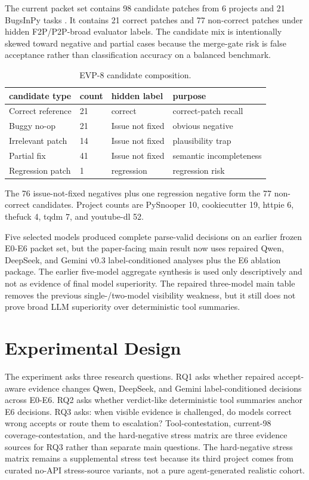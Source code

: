 \documentclass[conference]{IEEEtran}
\begin{document}
The current packet set contains 98 candidate patches from 6 projects and 21 BugsInPy tasks \cite{widyasari_fse_2020_bugsinpy}. It contains 21 correct patches and 77 non-correct patches under hidden F2P/P2P-broad evaluator labels. The candidate mix is intentionally skewed toward negative and partial cases because the merge-gate risk is false acceptance rather than classification accuracy on a balanced benchmark.

\begin{table}[t]
\centering
\scriptsize
\setlength{\tabcolsep}{2pt}
\caption{EVP-8 candidate composition.}
\label{tab:apsec-2}
\begin{tabularx}{\textwidth}{YYYY}
\toprule
candidate type & count & hidden label & purpose \\
\midrule
Correct reference & 21 & correct & correct-patch recall \\
Buggy no-op & 21 & Issue not fixed & obvious negative \\
Irrelevant patch & 14 & Issue not fixed & plausibility trap \\
Partial fix & 41 & Issue not fixed & semantic incompleteness \\
Regression patch & 1 & regression & regression risk \\
\bottomrule
\end{tabularx}
\end{table}

The 76 issue-not-fixed negatives plus one regression negative form the 77 non-correct candidates. Project counts are PySnooper 10, cookiecutter 19, httpie 6, thefuck 4, tqdm 7, and youtube-dl 52.

Five selected models produced complete parse-valid decisions on an earlier frozen E0-E6 packet set, but the paper-facing main result now uses repaired Qwen, DeepSeek, and Gemini v0.3 label-conditioned analyses plus the E6 ablation package. The earlier five-model aggregate synthesis is used only descriptively and not as evidence of final model superiority. The repaired three-model main table removes the previous single-/two-model visibility weakness, but it still does not prove broad LLM superiority over deterministic tool summaries.

\section{Experimental Design}

The experiment asks three research questions. RQ1 asks whether repaired accept-aware evidence changes Qwen, DeepSeek, and Gemini label-conditioned decisions across E0-E6. RQ2 asks whether verdict-like deterministic tool summaries anchor E6 decisions. RQ3 asks: when visible evidence is challenged, do models correct wrong accepts or route them to escalation? Tool-contestation, current-98 coverage-contestation, and the hard-negative stress matrix are three evidence sources for RQ3 rather than separate main questions. The hard-negative stress matrix remains a supplemental stress test because its third project comes from curated no-API stress-source variants, not a pure agent-generated realistic cohort.
\end{document}
